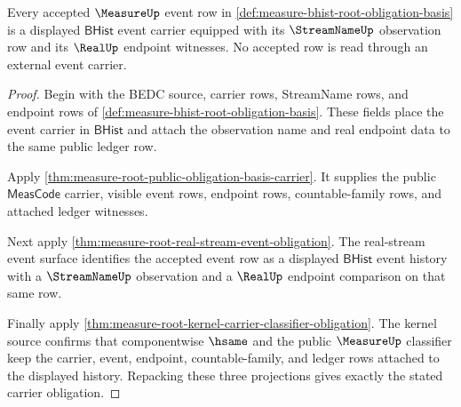 \begin{theorem}
\label{thm:measure-bhist-root-carrier-obligation}
Every accepted $\MeasureUp$ event row in
\autoref{def:measure-bhist-root-obligation-basis} is a displayed
$\mathsf{BHist}$ event carrier equipped with its $\StreamNameUp$ observation
row and its $\RealUp$ endpoint witnesses. No accepted row is read through an
external event carrier.
\end{theorem}
\begin{proof}
Begin with the BEDC source, carrier rows, StreamName rows, and endpoint rows
of \autoref{def:measure-bhist-root-obligation-basis}. These fields place the
event carrier in $\mathsf{BHist}$ and attach the observation name and real
endpoint data to the same public ledger row.

Apply \autoref{thm:measure-root-public-obligation-basis-carrier}. It supplies
the public $\mathsf{MeasCode}$ carrier, visible event rows, endpoint rows,
countable-family rows, and attached ledger witnesses.

Next apply \autoref{thm:measure-root-real-stream-event-obligation}. The
real-stream event surface identifies the accepted event row as a displayed
$\mathsf{BHist}$ event history with a $\StreamNameUp$ observation and a
$\RealUp$ endpoint comparison on that same row.

Finally apply \autoref{thm:measure-root-kernel-carrier-classifier-obligation}.
The kernel source confirms that componentwise $\hsame$ and the public
$\MeasureUp$ classifier keep the carrier, event, endpoint, countable-family,
and ledger rows attached to the displayed history. Repacking these three
projections gives exactly the stated carrier obligation.
\end{proof}

